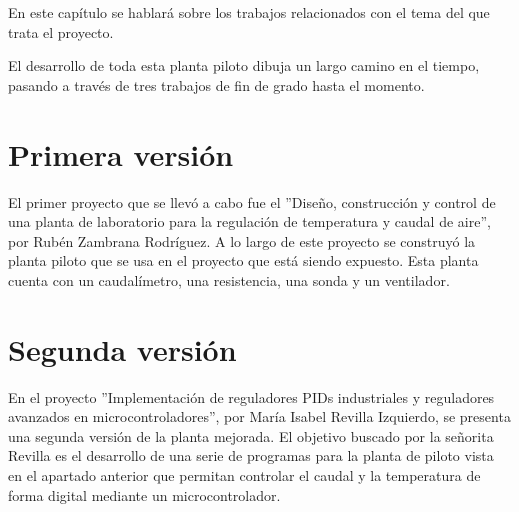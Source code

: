 
En este capítulo se hablará sobre los trabajos relacionados con el tema del que trata el proyecto.

El desarrollo de toda esta planta piloto dibuja un largo camino en el tiempo, pasando a través de tres trabajos de fin de grado hasta el momento.

\section{Primera versión}

El primer proyecto que se llevó a cabo fue el ''Diseño, construcción y control de una planta de laboratorio para la regulación de temperatura y caudal de aire'', por Rubén Zambrana Rodríguez. A lo largo de este proyecto se construyó la planta piloto que se usa en el proyecto que está siendo expuesto. Esta planta cuenta con un caudalímetro, una resistencia, una sonda y un ventilador.

\section{Segunda versión}

En el proyecto ''Implementación de reguladores PIDs industriales y reguladores avanzados en microcontroladores'', por María Isabel Revilla Izquierdo, se presenta una segunda versión de la planta mejorada. El objetivo buscado por la señorita Revilla es el desarrollo de una serie de programas para la planta de piloto vista en el apartado anterior que permitan controlar el caudal y la temperatura de forma digital mediante un microcontrolador.